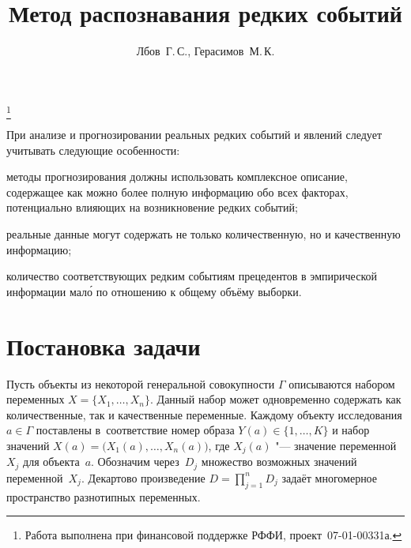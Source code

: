 \documentclass[twoside]{article}
\begin{document}
\title{Метод распознавания редких событий}
\author{Лбов~Г.\,С., Герасимов~М.\,К.}
\thanks{Работа выполнена при финансовой поддержке РФФИ, проект \No\,07-01-00331а.}
\maketitle

При анализе и прогнозировании реальных редких событий и явлений следует учитывать следующие особенности:
\begin{enumerate*}
    \item {методы прогнозирования должны использовать комплексное описание, содержащее как можно более полную
информацию обо всех факторах, потенциально влияющих на возникновение редких событий;}
    \item {реальные данные могут содержать не только количественную, но и качественную информацию;}
    \item {количество соответствующих редким событиям прецедентов в эмпирической информации мал\'о
по отношению к общему объёму выборки.}
\end{enumerate*}

\section{Постановка задачи}
Пусть объекты из некоторой генеральной совокупности $\Gamma$ описываются набором
переменных ${X=\{X_1,\ldots,X_n\}}$.
Данный набор может одновременно содержать
как количественные, так и качественные переменные.
Каждому объекту исследования
$a\in\Gamma$ поставлены в~соответствие номер образа 
$Y(a)\in \{ 1,\ldots,K \}$ и набор значений
$X(a)=\bigl(X_1(a),\ldots, X_n(a)\bigr)$, где $X_j(a)$
"--- значение переменной~$X_j$ для объекта~$a$.  Обозначим
через~$D_j$ множество возможных значений переменной~$X_j$.
Декартово произведение $D=\prod\limits_{j=1}^n D_j$  задаёт многомерное
пространство разнотипных переменных.
\end{document}
